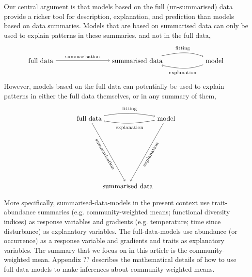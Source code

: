 \documentclass[12pt]{ecology}
\begin{document}
Our central argument is that models based on the full (un-summarised) data provide a richer tool for description, explanation, and prediction than models based on data summaries.  Models that are based on summarised data can only be used to explain patterns in these summaries, and not in the full data,
\begin{equation}
\begin{tikzpicture}
  \node (full) at (0,0) {full data};
  \node (sum) at (5,0) {summarised data};
  \node (mod) at (9,0) {model};
  \draw[->] (full) to node [above] {\scriptsize summarisation} (sum);
  \draw[->] (sum) to [out = 11, in = 160] node [above] {\scriptsize fitting} (mod);
  \draw[->] (mod) to [out = -160, in = -11] node [below] {\scriptsize explanation} (sum);
\end{tikzpicture}
\end{equation}
However, models based on the full data can potentially be used to explain patterns in either the full data themselves, or in any summary of them,
\begin{equation}
\begin{tikzpicture}
  \node (full) at (0,3.5) {full data};
  \node (mod) at (4,3.5) {model};
  \node (sum) at (2,0) {summarised data};
  \draw[->] (full) to [out = 10, in = 170] node [above] {\scriptsize fitting} (mod);
  \draw[->] (mod) to [out = -170, in = -10] node [below] {\scriptsize explanation} (full);
  \draw[->] (full) to node [below, rotate = -60] {\scriptsize summarisation} (sum);
  \draw[->] (mod) to node [below, rotate = 60] {\scriptsize explanation} (sum);
\end{tikzpicture}
\end{equation}

More specifically, summarised-data-models in the present context use trait-abundance summaries (e.g. community-weighted means; functional diversity indices) as response variables and gradients (e.g. temperature; time since disturbance) as explanatory variables.  The full-data-models use abundance (or occurrence) as a response variable and gradients and traits as explanatory variables.  The summary that we focus on in this article is the community-weighted mean.  Appendix ?? describes the mathematical details of how to use full-data-models to make inferences about community-weighted means.


\end{document}
